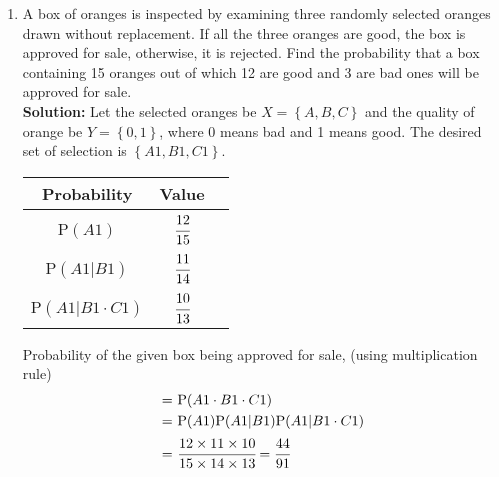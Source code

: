 \documentclass[journal,12pt,twocolumn]{IEEEtran}
\providecommand{\cbrak}[1]{\ensuremath{\left\{#1\right\}}}
\newcommand{\solution}{\noindent \textbf{Solution: }}
\newcommand\T{\rule{0pt}{2.6ex}}       %
\begin{document}
\begin{enumerate}[label=13.\arabic{enumi}.\arabic{enumii}]

\setcounter{enumi}{1}
\setcounter{enumii}{3}
\item A box of oranges is inspected by examining three randomly selected oranges drawn without replacement. If all the three oranges are good, the box is approved for sale, otherwise, it is rejected. Find the probability that a box containing 15 oranges out of which 12 are good and 3 are bad ones will be approved for sale.\\
	\solution
		Let the selected oranges be $X = \cbrak{A,B,C}$ and the quality of orange be $Y = \cbrak{0,1}$, where 0 means bad and 1 means good. The desired set of selection is \cbrak{A1,B1,C1}.
	\begin{table}[h!]
	\small
	\centering
		\begin{tabular}[20pt]{|c|c|c|} \hline
			\textbf{Probability}&\textbf{Value}\\ \hline
			P$(A1)$ \T  &$\cfrac{12}{15}$  \\[1.5ex] \hline
			P$(A1|B1)$&$\cfrac{11}{14}$  \\[1.5ex] \hline
			P$(A1|B1 \cdot C1)$&$\cfrac{10}{13}$  \\[1.5ex] \hline
		\end{tabular}
	\end{table}

		Probability of the given box being approved for sale, (using multiplication rule)
	\begin{align}
		=& \text{ }\text{P}(A1 \cdot B1 \cdot C1) \\
		=& \text{ }\text{P}(A1)\text{P}(A1|B1)\text{P}(A1|B1 \cdot C1) \\
		=& \text{ }\cfrac{12 \times 11 \times 10}{15 \times 14 \times 13} = \cfrac{44}{91}
	\end{align}


\end{enumerate}
\end{document}
